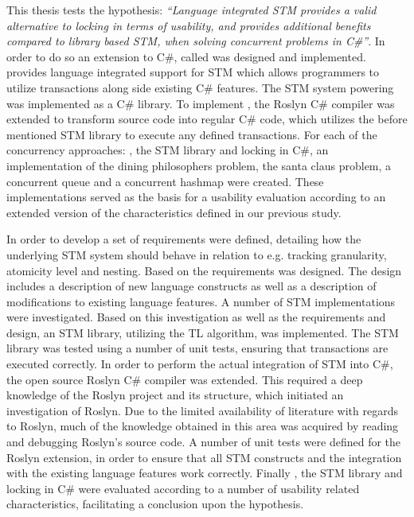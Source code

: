 \makeatletter {}\makeatother
{}

This thesis tests the hypothesis: \textit{``Language integrated \ac{STM} provides a valid alternative to locking in terms of usability, and provides additional benefits compared to library based \ac{STM}, when solving concurrent problems in C\#''}. In order to do so an extension to C\#, called \stmname was designed and implemented. \stmname provides language integrated support for \ac{STM} which allows programmers to utilize transactions along side existing C\# features. The \ac{STM} system powering \stmname was implemented as a C\# library. To implement \stmname, the Roslyn C\# compiler was extended to transform \stmname source code into regular C\# code, which utilizes the before mentioned \ac{STM} library to execute any defined transactions. For each of the concurrency approaches: \stmname, the \ac{STM} library and locking in C\#, an implementation of the dining philosophers problem, the santa claus problem, a concurrent queue and a concurrent hashmap were created. These implementations served as the basis for a usability evaluation according to an extended version of the characteristics defined in our previous study\cite{dpt907e14trending}. 

In order to develop \stmname a set of requirements were defined, detailing how the underlying \ac{STM} system should behave in relation to e.g. tracking granularity, atomicity level and nesting. Based on the requirements \stmname was designed. The design includes a description of new language constructs as well as a description of modifications to existing language features. A number of \ac{STM} implementations were investigated. Based on this investigation as well as the requirements and design, an \ac{STM} library, utilizing the TL algorithm, was implemented. The \ac{STM} library was tested using a number of unit tests, ensuring that transactions are executed correctly. In order to perform the actual integration of \ac{STM} into C\#, the open source Roslyn C\# compiler was extended. This required a deep knowledge of the Roslyn project and its structure, which initiated an investigation of Roslyn. Due to the limited availability of literature with regards to Roslyn, much of the knowledge obtained in this area was acquired by reading and debugging Roslyn's source code. A number of unit tests were defined for the Roslyn extension, in order to ensure that all \ac{STM} constructs and the integration with the existing language features work correctly. Finally \stmname, the \ac{STM} library and locking in C\# were evaluated according to a number of usability related characteristics, facilitating a conclusion upon the hypothesis.

